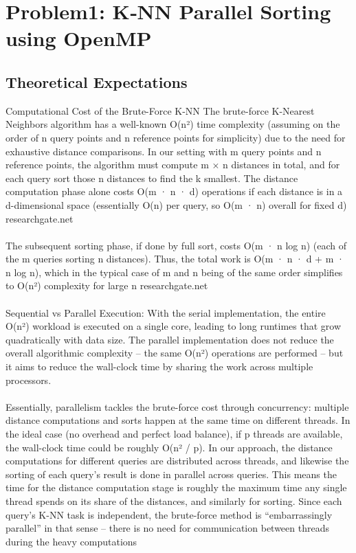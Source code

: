 \section{Problem1: K‑NN Parallel Sorting using OpenMP}
\subsection{Theoretical Expectations}
Computational Cost of the Brute-Force K-NN
The brute-force K-Nearest Neighbors algorithm has a well-known O(n²) time complexity (assuming on the order of n query points and n reference points for simplicity) due to the need for exhaustive distance comparisons. In our setting with m query points and n reference points, the algorithm must compute m × n distances in total, and for each query sort those n distances to find the k smallest. The distance computation phase alone costs O(m · n · d) operations if each distance is in a d-dimensional space (essentially O(n) per query, so O(m · n) overall for fixed d)
researchgate.net
\\\\
The subsequent sorting phase, if done by full sort, costs O(m · n log n) (each of the m queries sorting n distances). Thus, the total work is O(m · n · d + m · n log n), which in the typical case of m and n being of the same order simplifies to O(n²) complexity for large n
researchgate.net
\\\\
Sequential vs Parallel Execution: With the serial implementation, the entire O(n²) workload is executed on a single core, leading to long runtimes that grow quadratically with data size. The parallel implementation does not reduce the overall algorithmic complexity – the same O(n²) operations are performed – but it aims to reduce the wall-clock time by sharing the work across multiple processors.
\\\\
Essentially, parallelism tackles the brute-force cost through concurrency: multiple distance computations and sorts happen at the same time on different threads. In the ideal case (no overhead and perfect load balance), if p threads are available, the wall-clock time could be roughly O(n² / p). In our approach, the distance computations for different queries are distributed across threads, and likewise the sorting of each query’s result is done in parallel across queries. This means the time for the distance computation stage is roughly the maximum time any single thread spends on its share of the distances, and similarly for sorting. Since each query’s K-NN task is independent, the brute-force method is “embarrassingly parallel” in that sense – there is no need for communication between threads during the heavy computations
